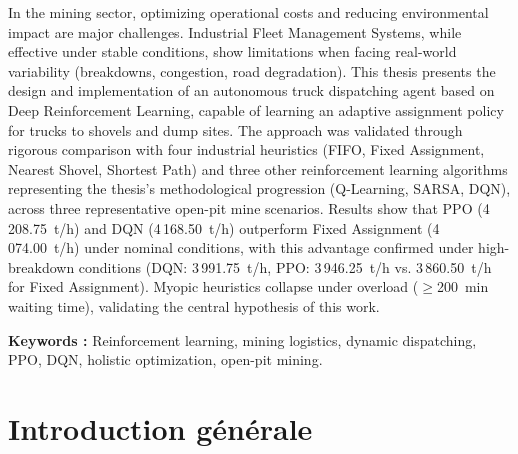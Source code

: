 \documentclass[11pt,a4paper]{report}
\begin{document}
In the mining sector, optimizing operational costs and reducing environmental impact are major challenges. Industrial Fleet Management Systems, while effective under stable conditions, show limitations when facing real-world variability (breakdowns, congestion, road degradation). This thesis presents the design and implementation of an autonomous truck dispatching agent based on Deep Reinforcement Learning, capable of learning an adaptive assignment policy for trucks to shovels and dump sites. The approach was validated through rigorous comparison with four industrial heuristics (FIFO, Fixed Assignment, Nearest Shovel, Shortest Path) and three other reinforcement learning algorithms representing the thesis's methodological progression (Q-Learning, SARSA, DQN), across three representative open-pit mine scenarios. Results show that PPO (4\,208.75~t/h) and DQN (4\,168.50~t/h) outperform Fixed Assignment (4\,074.00~t/h) under nominal conditions, with this advantage confirmed under high-breakdown conditions (DQN: 3\,991.75~t/h, PPO: 3\,946.25~t/h vs. 3\,860.50~t/h for Fixed Assignment). Myopic heuristics collapse under overload ($\geq$200~min waiting time), validating the central hypothesis of this work.

\vspace{1cm}
\noindent\textbf{Keywords :} Reinforcement learning, mining logistics, dynamic dispatching, PPO, DQN, holistic optimization, open-pit mining.

\newpage

\tableofcontents
\newpage

\listoffigures
{}
\newpage

\listoftables
{}
\newpage


\chapter*{Introduction générale}
\end{document}
